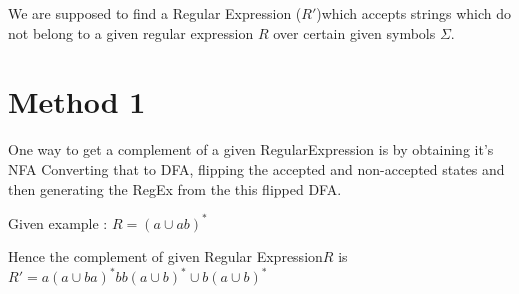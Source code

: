 \documentclass[12pt,letterpaper]{article}
\begin{document}
We are supposed to find a Regular Expression ($R'$)which accepts strings which do not belong to a given regular expression $R$ over certain given symbols $\Sigma$.
\section*{Method 1}
One way to get a complement of a given RegularExpression is by obtaining it's NFA Converting that to DFA, flipping the accepted and non-accepted states and then generating the RegEx from the this flipped DFA.

Given example : \textbf{$R = (a \cup ab)^*$}





Hence the complement of given Regular Expression$R$ is $R' = a{(a \cup ba)}^* bb{(a\cup b)}^* \cup b(a \cup b )^*$
\end{document}
